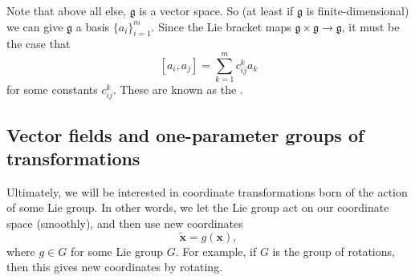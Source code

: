 \documentclass[a4paper]{article}
\begin{document}
Note that above all else, $\mathfrak{g}$ is a vector space. So (at least if $\mathfrak{g}$ is finite-dimensional) we can give $\mathfrak{g}$ a basis $\{a_i\}_{i = 1}^m$. Since the Lie bracket maps $\mathfrak{g} \times \mathfrak{g} \to \mathfrak{g}$, it must be the case that
\[
  [a_i, a_j] = \sum_{k = 1}^m c_{ij}^k a_k
\]
for some constants $c_{ij}^k$. These are known as the .
\subsection{Vector fields and one-parameter groups of transformations}
Ultimately, we will be interested in coordinate transformations born of the action of some Lie group. In other words, we let the Lie group act on our coordinate space (smoothly), and then use new coordinates
\[
  \tilde{\mathbf{x}} = g(\mathbf{x}),
\]
where $g \in G$ for some Lie group $G$. For example, if $G$ is the group of rotations, then this gives new coordinates by rotating.
\end{document}
